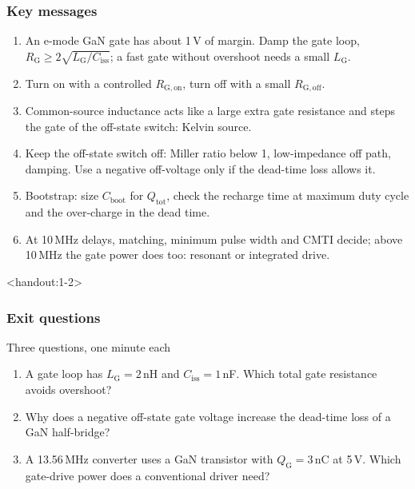 \begin{frame}
	\frametitle{Key messages}
	\begin{enumerate}
		\item An e-mode GaN gate has about 1\,V of margin. Damp the gate loop, $R_\mathrm{G}\geq2\sqrt{L_\mathrm{G}/C_\mathrm{iss}}$; a fast gate without overshoot needs a small $L_\mathrm{G}$.
		\item Turn on with a controlled $R_\mathrm{G,on}$, turn off with a small $R_\mathrm{G,off}$.
		\item Common-source inductance acts like a large extra gate resistance and steps the gate of the off-state switch: Kelvin source.
		\item Keep the off-state switch off: Miller ratio below 1, low-impedance off path, damping. Use a negative off-voltage only if the dead-time loss allows it.
		\item Bootstrap: size $C_\mathrm{boot}$ for $Q_\mathrm{tot}$, check the recharge time at maximum duty cycle and the over-charge in the dead time.
		\item At 10\,MHz delays, matching, minimum pulse width and CMTI decide; above 10\,MHz the gate power does too: resonant or integrated drive.
	\end{enumerate}
\end{frame}

\begin{frame}<handout:1-2>
	\frametitle{Exit questions}
	\begin{varblock}[\textwidth]{Three questions, one minute each}
		\begin{enumerate}
			\item A gate loop has $L_\mathrm{G}=2$\,nH and $C_\mathrm{iss}=1$\,nF. Which total gate resistance avoids overshoot?
			\item Why does a negative off-state gate voltage increase the dead-time loss of a GaN half-bridge?
			\item A 13.56\,MHz converter uses a GaN transistor with $Q_\mathrm{G}=3$\,nC at 5\,V. Which gate-drive power does a conventional driver need?
		\end{enumerate}
	\end{varblock}
\end{frame}


